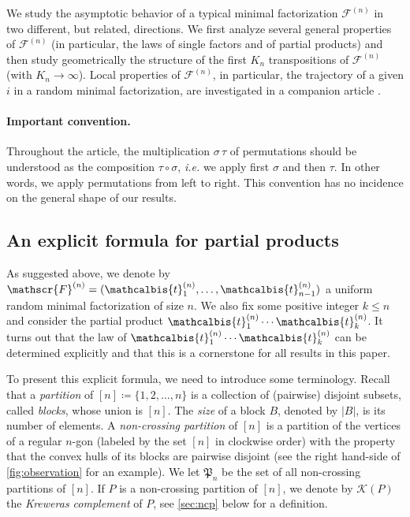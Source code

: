 \documentclass[10pt]{amsart}
\theoremstyle{definition}\newtheorem{defi}[theo]{Definition}\newtheorem{rema}[theo]{Remark}\newtheorem{exam}[theo]{Example}\newtheorem{exem}[theo]{Example}\newtheorem{nota}[theo]{Notation}
\def\tb{\mathcalbis{t}}
\begin{document}
We study the asymptotic behavior of a typical minimal factorization $ \mathscr{F}^{(n)}$ in two different, but related, directions. We first analyze several general properties of $ \mathscr{F}^{(n)}$
(in particular, the laws of single factors and of partial products)
and then study geometrically the structure of the first $K_{n}$ transpositions of $ \mathscr{F}^{(n)}$
(with $K_{n} \rightarrow \infty$).
Local properties of $\mathscr{F}^{(n)}$, in particular, the trajectory
of a given $i$ in a random minimal factorization,
are investigated in a companion article \cite{FK18}.
\smallskip

\paragraph*{Important convention.} Throughout the article, the multiplication $\sigma\, \tau$ of permutations
should be understood as the composition $\tau \circ \sigma$, {\em i.e.}
we apply first $\sigma$ and then $\tau$.
In other words, we apply permutations from left to right.
This convention has no incidence on the general shape of our results.

\subsection{An explicit formula for partial products}
As suggested above, we denote by \hbox{$\mathscr{F}^{(n)}= (\tb_{1}^{(n)}, \ldots, \tb_{n-1}^{(n)})$}
a uniform random minimal factorization of size $n$.
We also fix some positive integer $k \le n$ and consider the partial product
$\tb_{1}^{(n)} \cdots \tb_k^{(n)}$.
It turns out that the law of $\tb_{1}^{(n)} \cdots \tb_k^{(n)}$ can be determined explicitly
and that this is a cornerstone for all results in this paper.

To present this explicit formula, we need to introduce some terminology.
 Recall that a \emph{partition} of $[n] \coloneqq \{1,2, \ldots,n\}$ is a collection of (pairwise) disjoint subsets,
 called \emph{blocks}, whose union is $[n]$.
 The \emph{size} of a block $B$, denoted by $|B|$, is its number of elements.
 A \emph{non-crossing partition} of $[n]$ is a partition of the vertices of a regular $n$-gon (labeled by the set $[n]$ in clockwise order) with the property that the convex hulls of its blocks are pairwise disjoint (see the right hand-side of \cref{fig:observation} for an example).
 We let $ \mathfrak{P}_{n}$ be the set of all non-crossing partitions of $[n]$.
 If $P$ is a non-crossing partition of $[n]$, we denote by $ \mathcal{K}(P)$ the \emph{Kreweras complement} of $P$, see \cref{sec:ncp} below for a definition.
\end{document}
